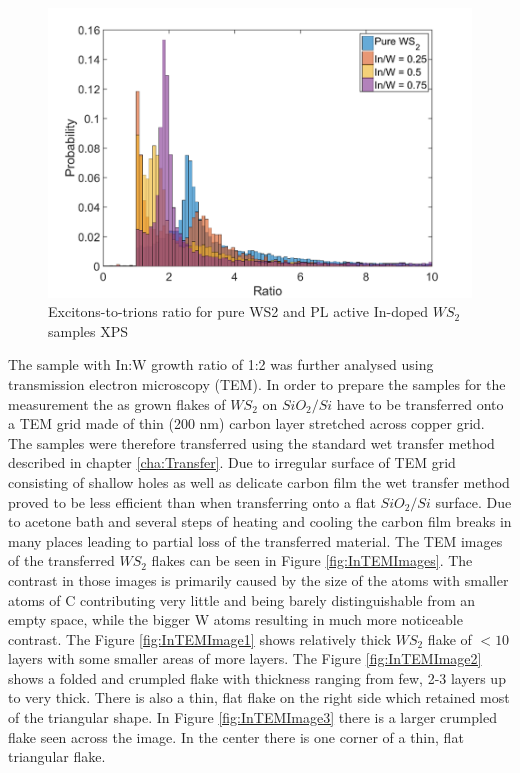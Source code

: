 \begin{figure}[!h]
	\begin{center}
		\includegraphics[scale=0.5]{In/PLRatioHistogram.png}
		\caption{Excitons-to-trions ratio for pure WS2 and PL active In-doped $WS_2$ samples XPS}
		\label{fig:InPLRatioHistogram}
	\end{center}
\end{figure}


The sample with In:W growth ratio of 1:2 was further analysed using transmission electron microscopy (TEM). In order to prepare the samples for the measurement the as grown flakes of $WS_2$ on $SiO_2/Si$ have to be transferred onto a TEM grid made of thin (200 nm) carbon layer stretched across copper grid. The samples were therefore transferred using the standard wet transfer method described in chapter \ref{cha:Transfer}. Due to irregular surface of TEM grid consisting of shallow holes as well as delicate carbon film the wet transfer method proved to be less efficient than when transferring onto a flat $SiO_2/Si$ surface. Due to acetone bath and several steps of heating and cooling the carbon film breaks in many places leading to partial loss of the transferred material. The TEM images of the transferred $WS_2$ flakes can be seen in Figure \ref{fig:InTEMImages}. The contrast in those images is primarily caused by the size of the atoms with smaller atoms of C contributing very little and being barely distinguishable from an empty space, while the bigger W atoms resulting in much more noticeable contrast. The Figure \ref{fig:InTEMImage1} shows relatively thick $WS_2$ flake of $<10$ layers with some smaller areas of more layers. The Figure \ref{fig:InTEMImage2} shows a folded and crumpled flake with thickness ranging from few, 2-3 layers up to very thick. There is also a thin, flat flake on the right side which retained most of the triangular shape. In Figure \ref{fig:InTEMImage3} there is a larger crumpled flake seen across the image. In the center there is one corner of a thin, flat triangular flake.

